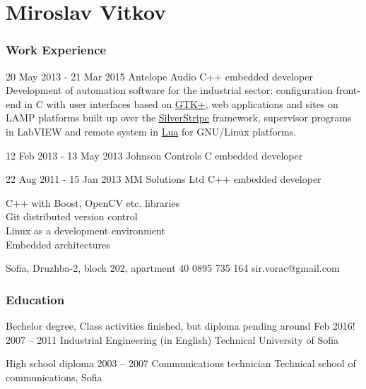 \documentclass{tccv}
\begin{document}
\part{Miroslav Vitkov}

\section{Work Experience}
\begin{eventlist}
\item{20 May 2013 - 21 Mar 2015}
     {Antelope Audio}
     {C++ embedded developer} \\
Development of automation software for the industrial sector:
configuration front-end in C with user interfaces based on
\href{http://www.gtk.org/}{GTK+}, web applications and sites
on LAMP platforms built up over the
\href{http://www.silverstripe.org/}{SilverStripe} framework,
supervisor programs in LabVIEW and remote system in
\href{http://www.lua.org/}{Lua} for GNU/Linux platforms.

\item{12 Feb 2013 - 13 May 2013}
     {Johnson Controls}
     {C embedded developer}

\item{22 Aug 2011 - 15 Jan 2013}
     {MM Solutions Ltd}
     {C++ embedded developer}

C++ with Boost, OpenCV etc. libraries  \\
Git distributed version control        \\
Linux as a development environment     \\
Embedded architectures                 \\
\end{eventlist}

\personal
    {Sofia, Druzhba-2, block 202, apartment 40}
    {0895 735 164}
    {sir.vorac@gmail.com}

\section{Education}
\begin{yearlist}

\item[Bechelor degree, \small \textsf{Class activities finished, but diploma pending around Feb 2016!}]{2007 -- 2011}
     {Industrial Engineering (in English)}
     {Technical University of Sofia}

\item[High school diploma]{2003 -- 2007}
     {Communications technician}
     {Technical school of communications, Sofia}
\end{yearlist}
\end{document}
